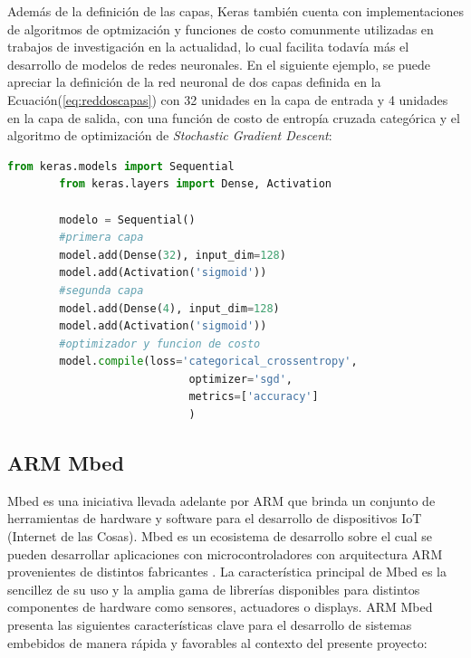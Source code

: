     Además de la definición de las capas, Keras también cuenta con implementaciones de algoritmos de optmización y funciones de costo 
    comunmente utilizadas en trabajos de investigación en la actualidad, lo cual facilita todavía más el desarrollo de modelos de 
    redes neuronales. En el siguiente 
    ejemplo, se puede apreciar la definición de la red neuronal de dos capas definida en la Ecuación(\ref{eq:reddoscapas}) con 32 unidades en 
    la capa de entrada y 4 unidades en la capa de salida, con una función de costo de entropía cruzada categórica y el algoritmo de 
    optimización de \textit{Stochastic Gradient Descent}:

    \begin{lstlisting}[language=Python]
        from keras.models import Sequential
        from keras.layers import Dense, Activation

        modelo = Sequential()
        #primera capa
        model.add(Dense(32), input_dim=128)
        model.add(Activation('sigmoid'))
        #segunda capa
        model.add(Dense(4), input_dim=128)
        model.add(Activation('sigmoid'))
        #optimizador y funcion de costo
        model.compile(loss='categorical_crossentropy',
                            optimizer='sgd',
                            metrics=['accuracy']
                            )
    \end{lstlisting}

    \subsection{ARM Mbed}
    Mbed es una iniciativa llevada adelante por ARM que brinda un conjunto de herramientas de hardware y software para el 
    desarrollo de dispositivos IoT (Internet de las Cosas). Mbed es un ecosistema de desarrollo sobre el cual se pueden 
    desarrollar aplicaciones con microcontroladores con arquitectura ARM provenientes de distintos fabricantes \cite{mbed}. La 
    característica principal de Mbed es la sencillez de su uso y la amplia gama de librerías disponibles para distintos componentes 
    de hardware como sensores, actuadores o displays. ARM Mbed presenta las siguientes características clave para el desarrollo 
    de sistemas embebidos de manera rápida y favorables al contexto del presente proyecto:

